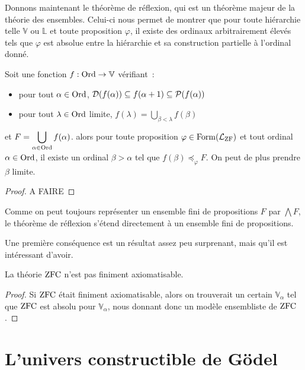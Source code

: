 Donnons maintenant le théorème de réflexion, qui est un théorème majeur de la
théorie des ensembles. Celui-ci nous permet de montrer que pour toute hiérarchie
telle $\mathbb V$ ou $\mathbb L$ et toute proposition $\varphi$, il existe des
ordinaux arbitrairement élevés tels que $\varphi$ est absolue entre la
hiérarchie et sa construction partielle à l'ordinal donné.

\begin{theorem}[Réflexion]
  Soit une fonction $f : \operatorname{Ord} \to \mathbb V$ vérifiant~:
  \begin{itemize}
  \item pour tout $\alpha \in \operatorname{Ord}$,
    $\mathcal{D}(f(\alpha))\subseteq f(\alpha + 1)\subseteq\mathcal{P}(f(\alpha))$
  \item pour tout $\lambda \in \operatorname{Ord}$ limite,
    $\displaystyle f(\lambda) = \bigcup_{\beta < \lambda} f(\beta)$
  \end{itemize}
  et $\displaystyle F = \bigcup_{\alpha \in \operatorname{Ord}} f(\alpha)$.
  alors pour toute proposition $\varphi\in\operatorname{Form}(\mathcal L_{\operatorname{ZF}})$ et tout
  ordinal $\alpha \in \operatorname{Ord}$, il existe un ordinal $\beta > \alpha$ tel que
  $f(\beta)\preccurlyeq_\varphi F$. On peut de plus prendre $\beta$ limite.
\end{theorem}

\begin{proof}
  A FAIRE
\end{proof}

\begin{remark}
  Comme on peut toujours représenter un ensemble fini de propositions $F$ par
  $\bigwedge F$, le théorème de réflexion s'étend directement à un ensemble fini
  de propositions.
\end{remark}

Une première conséquence est un résultat assez peu surprenant, mais qu'il est
intéressant d'avoir.

\begin{proposition}
  La théorie $\operatorname{ZFC}$ n'est pas finiment axiomatisable.
\end{proposition}

\begin{proof}
  Si $\operatorname{ZFC}$ était finiment axiomatisable, alors on trouverait un certain
  $\mathbb V_\alpha$ tel que $\operatorname{ZFC}$ est absolu pour $\mathbb V_\alpha$, nous
  donnant donc un modèle ensembliste de $\operatorname{ZFC}$.
\end{proof}

\section{L'univers constructible de Gödel}

